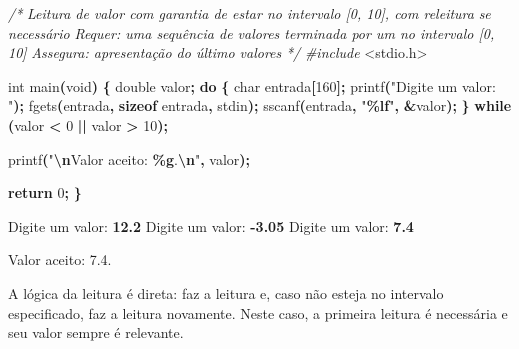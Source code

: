 \documentclass[
  11pt,
  a4paper,
]{scrbook}
\newenvironment{Shaded}{\begin{snugshade}}{\end{snugshade}}
\newcommand{\CommentTok}[1]{\textcolor[rgb]{0.56,0.35,0.01}{\textit{#1}}}
\newcommand{\ControlFlowTok}[1]{\textcolor[rgb]{0.13,0.29,0.53}{\textbf{#1}}}
\newcommand{\DataTypeTok}[1]{\textcolor[rgb]{0.13,0.29,0.53}{#1}}
\newcommand{\DecValTok}[1]{\textcolor[rgb]{0.00,0.00,0.81}{#1}}
\newcommand{\ImportTok}[1]{#1}
\newcommand{\KeywordTok}[1]{\textcolor[rgb]{0.13,0.29,0.53}{\textbf{#1}}}
\newcommand{\NormalTok}[1]{#1}
\newcommand{\OperatorTok}[1]{\textcolor[rgb]{0.81,0.36,0.00}{\textbf{#1}}}
\newcommand{\PreprocessorTok}[1]{\textcolor[rgb]{0.56,0.35,0.01}{\textit{#1}}}
\newcommand{\SpecialCharTok}[1]{\textcolor[rgb]{0.81,0.36,0.00}{\textbf{#1}}}
\newcommand{\StringTok}[1]{\textcolor[rgb]{0.31,0.60,0.02}{#1}}
\begin{document}
\begin{Shaded}
\begin{Highlighting}[]
\CommentTok{/*}
\CommentTok{Leitura de valor com garantia de estar no intervalo [0, 10], com releitura}
\CommentTok{    se necessário}
\CommentTok{Requer: uma sequência de valores terminada por um no intervalo [0, 10]}
\CommentTok{Assegura: apresentação do último valores}
\CommentTok{*/}
\PreprocessorTok{\#include }\ImportTok{\textless{}stdio.h\textgreater{}}

\DataTypeTok{int}\NormalTok{ main}\OperatorTok{(}\DataTypeTok{void}\OperatorTok{)} \OperatorTok{\{}
    \DataTypeTok{double}\NormalTok{ valor}\OperatorTok{;}
    \ControlFlowTok{do} \OperatorTok{\{}
        \DataTypeTok{char}\NormalTok{ entrada}\OperatorTok{[}\DecValTok{160}\OperatorTok{];}
\NormalTok{        printf}\OperatorTok{(}\StringTok{"Digite um valor: "}\OperatorTok{);}
\NormalTok{        fgets}\OperatorTok{(}\NormalTok{entrada}\OperatorTok{,} \KeywordTok{sizeof}\NormalTok{ entrada}\OperatorTok{,}\NormalTok{ stdin}\OperatorTok{);}
\NormalTok{        sscanf}\OperatorTok{(}\NormalTok{entrada}\OperatorTok{,} \StringTok{"}\SpecialCharTok{\%lf}\StringTok{"}\OperatorTok{,} \OperatorTok{\&}\NormalTok{valor}\OperatorTok{);}
    \OperatorTok{\}} \ControlFlowTok{while} \OperatorTok{(}\NormalTok{valor }\OperatorTok{\textless{}} \DecValTok{0} \OperatorTok{||}\NormalTok{ valor }\OperatorTok{\textgreater{}} \DecValTok{10}\OperatorTok{);}

\NormalTok{    printf}\OperatorTok{(}\StringTok{"}\SpecialCharTok{\textbackslash{}n}\StringTok{Valor aceito: }\SpecialCharTok{\%g}\StringTok{.}\SpecialCharTok{\textbackslash{}n}\StringTok{"}\OperatorTok{,}\NormalTok{ valor}\OperatorTok{);}

    \ControlFlowTok{return} \DecValTok{0}\OperatorTok{;}
\OperatorTok{\}}
\end{Highlighting}
\end{Shaded}

\begin{Shaded}
\begin{Highlighting}[]
\NormalTok{Digite um valor: }\KeywordTok{ 12.2 }
\NormalTok{Digite um valor: }\KeywordTok{ {-}3.05 }
\NormalTok{Digite um valor: }\KeywordTok{ 7.4 }

\NormalTok{Valor aceito: 7.4.}
\end{Highlighting}
\end{Shaded}

A lógica da leitura é direta: faz a leitura e, caso não esteja no
intervalo especificado, faz a leitura novamente. Neste caso, a primeira
leitura é necessária e seu valor sempre é relevante.
\end{document}
